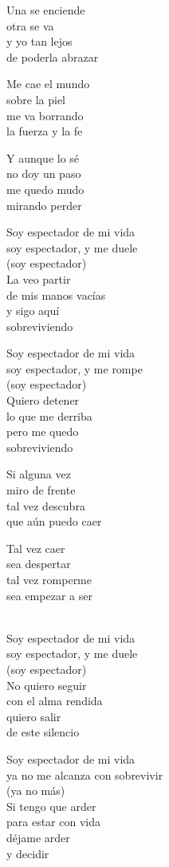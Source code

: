 \begin{lyrics}
Una se enciende\\
otra se va\\
y yo tan lejos\\
de poderla abrazar

Me cae el mundo\\
sobre la piel\\
me va borrando\\
la fuerza y la fe

Y aunque lo sé\\
no doy un paso\\
me quedo mudo\\
mirando perder

Soy espectador de mi vida\\
soy espectador, y me duele\\
(soy espectador)\\
La veo partir\\
de mis manos vacías\\
y sigo aquí\\
sobreviviendo

Soy espectador de mi vida\\
soy espectador, y me rompe\\
(soy espectador)\\
Quiero detener\\
lo que me derriba\\
pero me quedo\\
sobreviviendo

Si alguna vez\\
miro de frente\\
tal vez descubra\\
que aún puedo caer

Tal vez caer\\
sea despertar\\
tal vez romperme\\
sea empezar a ser

\\
Soy espectador de mi vida\\
soy espectador, y me duele\\
(soy espectador)\\
No quiero seguir\\
con el alma rendida\\
quiero salir\\
de este silencio

Soy espectador de mi vida\\
ya no me alcanza con sobrevivir\\
(ya no más)\\
Si tengo que arder\\
para estar con vida\\
déjame arder\\
y decidir
\end{lyrics}


